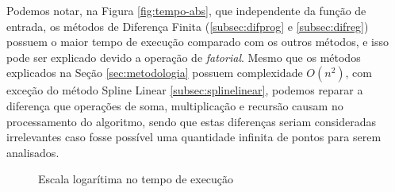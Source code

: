 \documentclass[conference]{IEEEtran}
\begin{document}
Podemos notar, na Figura \ref{fig:tempo-abs}, que independente da função de entrada, os métodos de Diferença Finita (\ref{subsec:difprog} e \ref{subsec:difreg}) possuem o maior tempo de execução comparado com os outros métodos, e isso pode ser explicado devido a operação de \emph{fatorial}. Mesmo que os métodos explicados na Seção \ref{sec:metodologia} possuem complexidade $O(n^2)$, com exceção do método Spline Linear \ref{subsec:splinelinear}, podemos reparar a diferença que operações de soma, multiplicação e recursão causam no processamento do algoritmo, sendo que estas diferenças seriam consideradas irrelevantes caso fosse possível uma quantidade infinita de pontos para serem analisados.

\begin{figure}[t]
   \hspace{\fill}
   \hspace{\fill}
  \caption{Escala logarítima no tempo de execução} 
  \label{fig:tempo-log10}
\end{figure}
\end{document}
